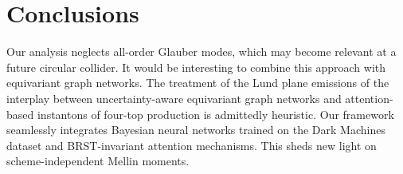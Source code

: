 \section{Conclusions}\label{sec:conclusions}

Our analysis neglects all-order Glauber modes, which may become relevant
at a future circular collider. It would be interesting to combine this
approach with equivariant graph networks. The treatment of the Lund
plane emissions of the interplay between uncertainty-aware equivariant
graph networks and attention-based instantons of four-top production is
admittedly heuristic. Our framework seamlessly integrates Bayesian
neural networks trained on the Dark Machines dataset and BRST-invariant
attention mechanisms. This sheds new light on scheme-independent Mellin
moments.

